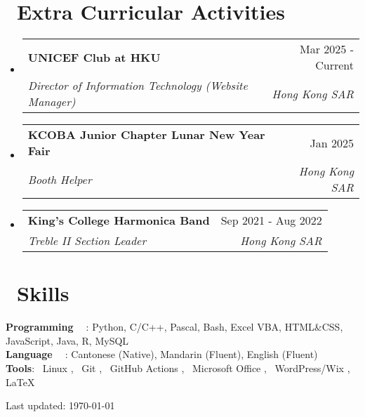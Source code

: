 \documentclass[letterpaper,11pt]{article}
\makeatletter
\newcommand{\simpleicon}[2]{
  #1~#2
}
\newcommand{\iconsection}[2]{
  \section[#2]{#1~#2}
}
\newcommand{\resumeSubheading}[4]{
  \vspace{-2pt}\item
    \begin{tabular*}{0.98\textwidth}[t]{l@{\extracolsep{\fill}}r}
      \textbf{#1} & #2 \\
      \textit{\small#3} & \textit{\small #4} \\
    \end{tabular*}\vspace{-7pt}
}
\newcommand{\resumeSubHeadingListStart}{\begin{itemize}[leftmargin=0.15in, label={}]}
\newcommand{\resumeSubHeadingListEnd}{\end{itemize}}
\makeatother
\begin{document}
\iconsection{\faPeopleCarry}{Extra Curricular Activities}
  \resumeSubHeadingListStart
    \resumeSubheading
      {UNICEF Club at HKU}{Mar 2025 - Current}
      {Director of Information Technology (Website Manager)}{Hong Kong SAR}
    \resumeSubheading
      {KCOBA Junior Chapter Lunar New Year Fair}{Jan 2025}
      {Booth Helper}{Hong Kong SAR}
    \resumeSubheading
      {King's College Harmonica Band}{Sep 2021 - Aug 2022}
      {Treble II Section Leader}{Hong Kong SAR}
  \resumeSubHeadingListEnd

\iconsection{\faTools}{Skills}
  \begin{itemize}[leftmargin=0.15in, label={}]
    \small{\item{
      \textbf{Programming \simpleicon{\faCode}{}}{: Python, C/C++, Pascal, Bash, Excel VBA, HTML\&CSS, JavaScript, Java, R, MySQL} \\
      \textbf{Language \simpleicon{\faLanguage}{}}{: Cantonese (Native), Mandarin (Fluent), English (Fluent)} \\
      \textbf{Tools}{: \simpleicon{\faLinux}{Linux}, \simpleicon{\faGit}{Git}, \simpleicon{\faGithub}{GitHub Actions}, \simpleicon{\faMicrosoft}{Microsoft Office}, \simpleicon{\faWordpress}{WordPress/Wix}, \LaTeX}
    }}
  \end{itemize}

\vfill
\begin{center}
\footnotesize
Last updated: \today
\end{center}
\end{document}
